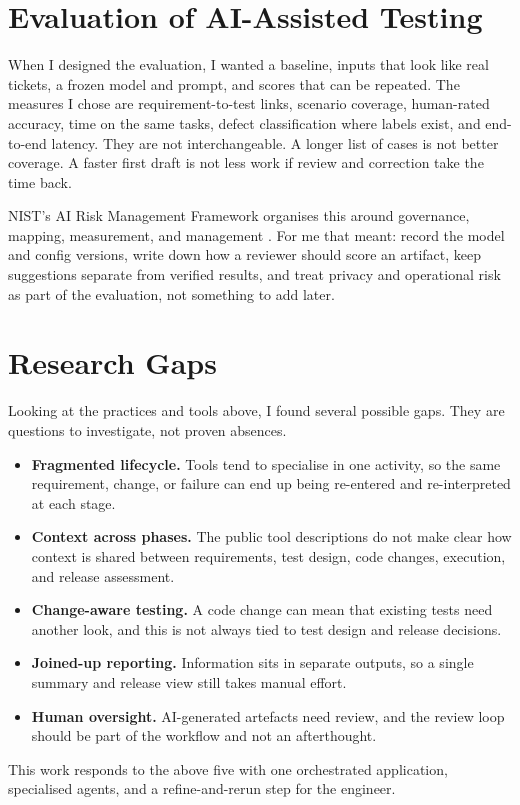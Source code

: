 \section{Evaluation of AI-Assisted Testing}
When I designed the evaluation, I wanted a baseline, inputs that look like real tickets, a frozen model and prompt, and scores that can be repeated. The measures I chose are requirement-to-test links, scenario coverage, human-rated accuracy, time on the same tasks, defect classification where labels exist, and end-to-end latency. They are not interchangeable. A longer list of cases is not better coverage. A faster first draft is not less work if review and correction take the time back.

NIST's AI Risk Management Framework organises this around governance, mapping, measurement, and management \cite{nistairmf}. For me that meant: record the model and config versions, write down how a reviewer should score an artifact, keep suggestions separate from verified results, and treat privacy and operational risk as part of the evaluation, not something to add later.

\section{Research Gaps}
Looking at the practices and tools above, I found several possible gaps. They are questions to investigate, not proven absences.
\begin{itemize}
  \item \textbf{Fragmented lifecycle.} Tools tend to specialise in one activity, so the same requirement, change, or failure can end up being re-entered and re-interpreted at each stage.
  \item \textbf{Context across phases.} The public tool descriptions do not make clear how context is shared between requirements, test design, code changes, execution, and release assessment.
  \item \textbf{Change-aware testing.} A code change can mean that existing tests need another look, and this is not always tied to test design and release decisions.
  \item \textbf{Joined-up reporting.} Information sits in separate outputs, so a single summary and release view still takes manual effort.
  \item \textbf{Human oversight.} AI-generated artefacts need review, and the review loop should be part of the workflow and not an afterthought.
\end{itemize}
This work responds to the above five with one orchestrated application, specialised agents, and a refine-and-rerun step for the engineer.